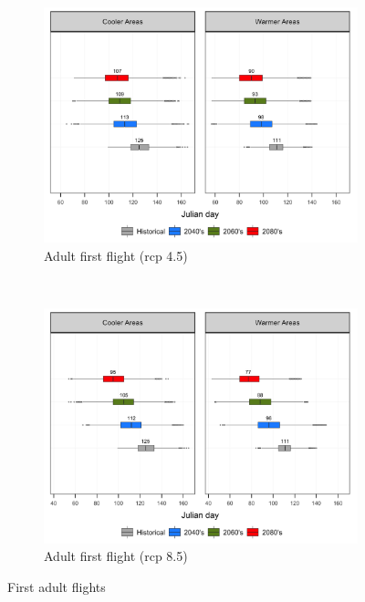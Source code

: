 \documentclass[12pt]{article}
\theoremstyle{plain}
\theoremstyle{definition}
\theoremstyle{definition}
\begin{document}
\begin{figure}[h!]
    \hspace{.1in}
    \begin{subfigure}[b]{0.5\textwidth}
        \includegraphics[width=\textwidth]{figures/adult_emergence_rcp45}
        \caption{Adult first flight (rcp 4.5)}
        \label{fig:aff_45}
    \end{subfigure}
     \hspace{-.2in}
    ~ %
    \begin{subfigure}[b]{0.5\textwidth}
        \includegraphics[width=\textwidth]{figures/adult_emergence_rcp85}
        \caption{Adult first flight (rcp 8.5)}
        \label{fig:aff_85}
    \end{subfigure}
    \caption{First adult flights}\label{fig:First_adult_flights}
\end{figure}
\end{document}
